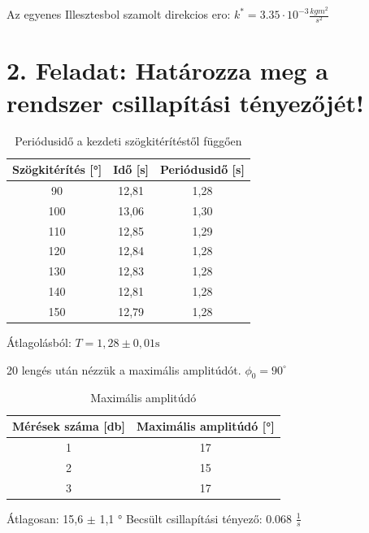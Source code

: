 \documentclass{article}
\begin{document}
Az egyenes Illesztesbol szamolt direkcios ero: $k^*=3.35 \cdot 10^{-3} \frac{kg m^2}{s^2}$

\newpage

\section*{2. Feladat: Határozza meg a rendszer csillapítási tényezőjét!}

\begin{table}[H]
    \centering
    \begin{tabular}{|c|c|c|}
        \hline
        Szögkitérítés [°] & Idő [s] & Periódusidő [s] \\ \hline
        90 & 12,81 & 1,28\\ \hline 
        100 & 13,06 & 1,30\\ \hline
        110 & 12,85 & 1,29\\ \hline 
        120 & 12,84 & 1,28\\ \hline
        130 & 12,83 & 1,28\\ \hline 
        140 & 12,81 & 1,28\\ \hline
        150 & 12,79&  1,28\\ \hline 

        
    \end{tabular}
    \caption{Periódusidő a kezdeti szögkitérítéstől függően}
    \label{tab:periodusido}
\end{table}

Átlagolásból: $T = 1,28 \pm 0,01 \text{s}$

20 lengés után nézzük a maximális amplitúdót.
$\phi_0 = 90^\circ$

\begin{table}[H]
    \centering
    \begin{tabular}{|c|c|}
        \hline
        Mérések száma [db] & Maximális amplitúdó [°] \\ \hline
         1 & 17 \\ \hline 
         2 & 15 \\ \hline
         3 & 17 \\ \hline 
        
    \end{tabular}
    \caption{Maximális amplitúdó}
    \label{tab:max_amplitudo}
\end{table}

Átlagosan: 15,6 $\pm$ 1,1 $\text{°}$
Becsült csillapítási tényező: 0.068 $\frac{1}{s}$

\newpage
\end{document}
